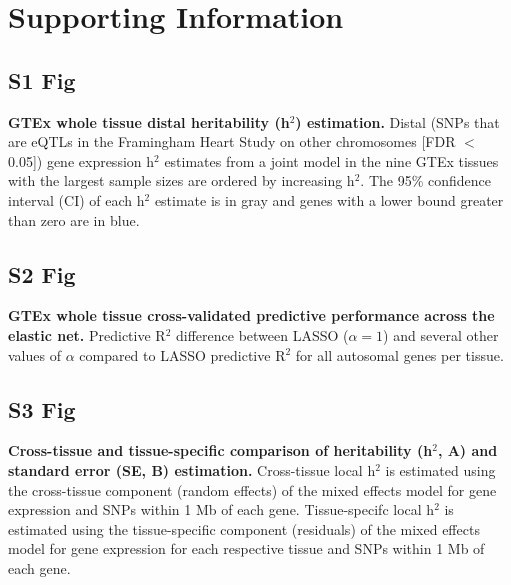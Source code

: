 \documentclass[10pt,letterpaper]{article}
\begin{document}
\nolinenumbers


%
%
% 



\section*{Supporting Information}


\subsection*{S1 Fig}
\label{S1_Fig}
{\bf GTEx whole tissue distal heritability (h$^2$) estimation.} Distal (SNPs that are eQTLs in the Framingham Heart Study on other chromosomes [FDR $<$ 0.05]) gene expression h$^2$ estimates from a joint model in the nine GTEx tissues with the largest sample sizes are ordered by increasing h$^2$. The 95\% confidence interval (CI) of each h$^2$ estimate is in gray and genes with a lower bound greater than zero are in blue.

\subsection*{S2 Fig}
\label{S2_Fig}
{\bf GTEx whole tissue cross-validated predictive performance across the elastic net.} Predictive R$^2$ difference between LASSO ($\alpha = 1$) and several other values of $\alpha$ compared to LASSO predictive R$^2$ for all autosomal genes per tissue.

\subsection*{S3 Fig}
\label{S3_Fig}
{\bf Cross-tissue and tissue-specific comparison of heritability (h$^2$, A) and standard error (SE, B) estimation.} Cross-tissue local h$^2$ is estimated using the cross-tissue component (random effects) of the mixed effects model for gene expression and SNPs within 1 Mb of each gene. Tissue-specifc local h$^2$ is estimated using the tissue-specific component (residuals) of the mixed effects model for gene expression for each respective tissue and SNPs within 1 Mb of each gene.
\end{document}
